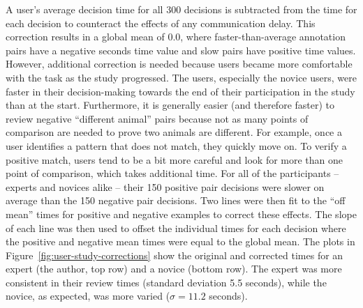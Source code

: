 A user's average decision time for all 300 decisions is subtracted from the time for each decision to counteract the effects of any communication delay.  This correction results in a global mean of 0.0, where faster-than-average annotation pairs have a negative seconds time value and slow pairs have positive time values.  However, additional correction is needed because users became more comfortable with the task as the study progressed.  The users, especially the novice users, were faster in their decision-making towards the end of their participation in the study than at the start.  Furthermore, it is generally easier (and therefore faster) to review negative ``different animal'' pairs because not as many points of comparison are needed to prove two animals are different.  For example, once a user identifies a pattern that does not match, they quickly move on.  To verify a positive match, users tend to be a bit more careful and look for more than one point of comparison, which takes additional time.  For all of the participants -- experts and novices alike -- their 150 positive pair decisions were slower on average than the 150 negative pair decisions.  Two lines were then fit to the ``off mean'' times for positive and negative examples to correct these effects.  The slope of each line was then used to offset the individual times for each decision where the positive and negative mean times were equal to the global mean.  The plots in Figure~\ref{fig:user-study-corrections} show the original and corrected times for an expert (the author, top row) and a novice (bottom row).  The expert was more consistent in their review times (standard deviation 5.5 seconds), while the novice, as expected, was more varied ($\sigma=11.2$ seconds).

